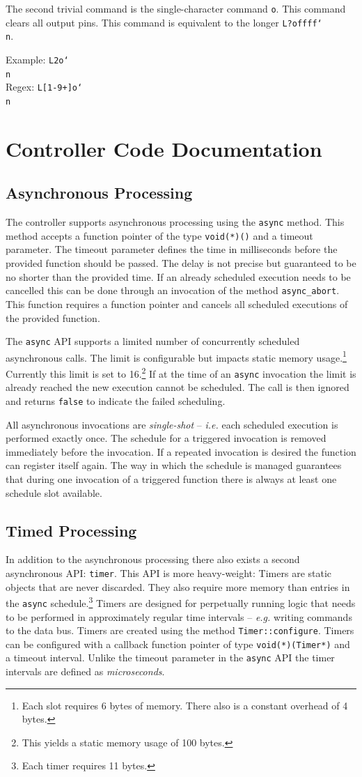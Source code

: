 \documentclass{scrreprt}
\newcommand\n{\char`\\n}
\newcommand\ie{\emph{i.e. }}
\newcommand\eg{\emph{e.g. }}
\newcommand{\code}[1]{\texttt{#1}}
\begin{document}
The second trivial command is the single-character command \texttt{o}.
This command clears all output pins.
This command is equivalent to the longer \texttt{L?offff\n}.

Example: \texttt{L2o\n}\\
Regex: \texttt{L[1-9+]o\n}

\chapter{Controller Code Documentation}
\section{Asynchronous Processing}
The controller supports asynchronous processing using the \code{async} method.
This method accepts a function pointer of the type \code{void(*)()} and a timeout parameter.
The timeout parameter defines the time in milliseconds before the provided function should be passed.
The delay is not precise but guaranteed to be no shorter than the provided time.
If an already scheduled execution needs to be cancelled this can be done through an invocation of the method \code{async\_abort}.
This function requires a function pointer and cancels all scheduled executions of the provided function.

The \code{async} API supports a limited number of concurrently scheduled asynchronous calls.
The limit is configurable but impacts static memory usage.\footnote{Each slot requires 6 bytes of memory. There also is a constant overhead of 4 bytes.}
Currently this limit is set to 16.\footnote{This yields a static memory usage of 100 bytes.}
If at the time of an \code{async} invocation the limit is already reached the new execution cannot be scheduled.
The call is then ignored and returns \code{false} to indicate the failed scheduling.

All asynchronous invocations are \emph{single-shot} -- \ie each scheduled execution is performed exactly once.
The schedule for a triggered invocation is removed immediately before the invocation.
If a repeated invocation is desired the function can register itself again.
The way in which the schedule is managed guarantees that during one invocation of a triggered function there is always at least one schedule slot available.

\section{Timed Processing}
In addition to the asynchronous processing there also exists a second asynchronous API: \code{timer}.
This API is more heavy-weight:
Timers are static objects that are never discarded.
They also require more memory than entries in the \code{async} schedule.\footnote{Each timer requires 11 bytes.}
Timers are designed for perpetually running logic that needs to be performed in approximately regular time intervals -- \eg writing commands to the data bus.
Timers are created using the method \code{Timer::configure}.
Timers can be configured with a callback function pointer of type \code{void(*)(Timer*)} and a timeout interval.
Unlike the timeout parameter in the \code{async} API the timer intervals are defined as \emph{microseconds}.
\end{document}
